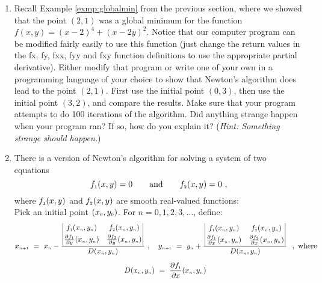 \begin{enumerate}[\bfseries 1.]
 \item Recall Example \ref{exmp:globalmin} from the previous section, where we showed that the point $(2,1)$ was a global minimum for the function $f(x,y) = (x-2)^4 + (x-2y)^2$. 
 Notice that our computer program can be modified fairly easily to use this function (just change the return values in the fx, fy, fxx, fyy and fxy
  function definitions to use the appropriate
  partial derivative). Either modify that program or write one of your own in a programming language of your
  choice to show that Newton's algorithm does lead to the point $(2,1)$. First use the initial point $(0,3)$, then use
  the initial point $(3,2)$, and compare the results. Make sure that your program attempts to do 100 iterations of the
  algorithm. Did anything strange happen when your program ran? If so, how do you explain it? (\emph{Hint: Something
  strange should happen.})
 \item There is a version of Newton's algorithm for solving a system of two equations
  \begin{displaymath}
   f_{\scriptscriptstyle 1}(x,y) = 0 \qquad\text{and}\qquad f_{\scriptscriptstyle 2}(x,y) = 0 ~,
  \end{displaymath}
  where $f_{\scriptscriptstyle 1}(x,y)$ and $f_{\scriptscriptstyle 2}(x,y)$ are smooth real-valued functions:\\
  Pick an initial point $(x_{\scriptscriptstyle 0},y_{\scriptscriptstyle 0})$. For $n = 0, 1, 2, 3, \dots$, define:
  \begin{gather*}
   \ssub{x}{n+1} ~=~ \ssub{x}{n} -
   \frac{
    \begin{vmatrix}
     \ssub{f}{1}(\ssub{x}{n},\ssub{y}{n}) &
     \ssub{f}{2}(\ssub{x}{n},\ssub{y}{n})\smallskip\\
     \frac{\partial \ssub{f}{1}}{\partial y}(\ssub{x}{n},\ssub{y}{n}) &
     \frac{\partial \ssub{f}{2}}{\partial y}(\ssub{x}{n},\ssub{y}{n})
    \end{vmatrix}}{D(\ssub{x}{n},\ssub{y}{n})} ~,\quad
   \ssub{y}{n+1} ~=~ \ssub{y}{n} +
   \frac{
    \begin{vmatrix}
     \ssub{f}{1}(\ssub{x}{n},\ssub{y}{n}) &
     \ssub{f}{2}(\ssub{x}{n},\ssub{y}{n})\smallskip\\
     \frac{\partial \ssub{f}{1}}{\partial x}(\ssub{x}{n},\ssub{y}{n}) &
     \frac{\partial \ssub{f}{2}}{\partial x}(\ssub{x}{n},\ssub{y}{n})
    \end{vmatrix}}{D(\ssub{x}{n},\ssub{y}{n})} ~~,~\text{where}\\[6pt]
    D(\ssub{x}{n},\ssub{y}{n}) ~=~ \frac{\partial \ssub{f}{1}}{\partial x}(\ssub{x}{n},\ssub{y}{n})\,

\end{gather*}
\end{enumerate}
